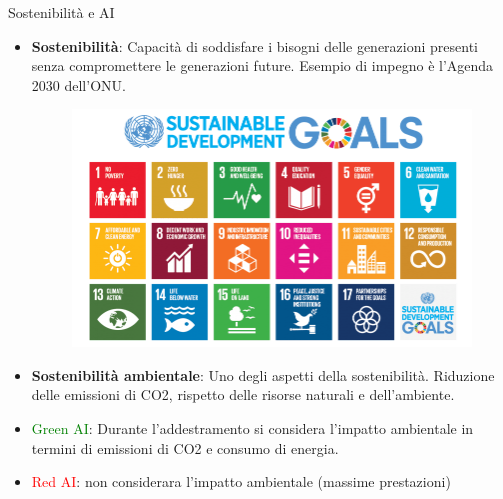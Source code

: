 \begin{frame}{Sostenibilità e AI} 
        \begin{itemize}
                \item {} \textbf{Sostenibilità}: Capacità di soddisfare i bisogni delle generazioni presenti senza compromettere le generazioni future. Esempio di impegno è l'Agenda 2030 dell'ONU.
                \begin{figure}[H]
                        \centering
                        \includegraphics[scale=0.15]{images/sdg.png}
                \end{figure}
                \item {} \textbf{Sostenibilità ambientale}: Uno degli aspetti della sostenibilità. Riduzione delle emissioni di CO2, rispetto delle risorse naturali e dell'ambiente.
                \item {} \textcolor{green}{Green AI}: Durante l'addestramento si considera l'impatto ambientale in termini di emissioni di CO2 e consumo di energia.
                \item {} \textcolor{red}{Red AI}: non considerara l'impatto ambientale (massime prestazioni)
        \end{itemize}
\end{frame}
